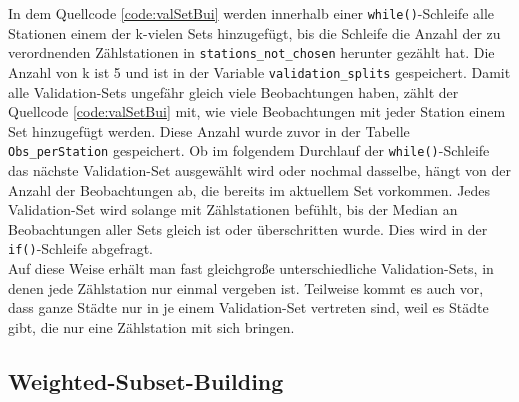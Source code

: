 \documentclass[a4paper,12pt]{thesis}
\begin{document}
In dem Quellcode \ref{code:valSetBui} werden innerhalb einer \lstinline|while()|-Schleife alle Stationen einem der k-vielen Sets hinzugefügt, bis die Schleife die Anzahl der zu verordnenden Zählstationen in \lstinline|stations_not_chosen| herunter gezählt hat. Die Anzahl von k ist 5 und ist in der Variable \lstinline|validation_splits| gespeichert. Damit alle Validation-Sets ungefähr gleich viele Beobachtungen haben, zählt der Quellcode \ref{code:valSetBui} mit, wie viele Beobachtungen mit jeder Station einem Set hinzugefügt werden. Diese Anzahl wurde zuvor in der Tabelle \lstinline|Obs_perStation| gespeichert. Ob im folgendem Durchlauf der \lstinline|while()|-Schleife das nächste Validation-Set ausgewählt wird oder nochmal dasselbe, hängt von der Anzahl der Beobachtungen ab, die bereits im aktuellem Set vorkommen. Jedes Validation-Set wird solange mit Zählstationen befühlt, bis der Median an Beobachtungen aller Sets gleich ist oder überschritten wurde. Dies wird in der \lstinline|if()|-Schleife abgefragt.\\
Auf diese Weise erhält man fast gleichgroße unterschiedliche Validation-Sets, in denen jede Zählstation nur einmal vergeben ist. Teilweise kommt es auch vor, dass ganze Städte nur in je einem Validation-Set vertreten sind, weil es Städte gibt, die nur eine Zählstation mit sich bringen.

\subsection{Weighted-Subset-Building}
\end{document}
